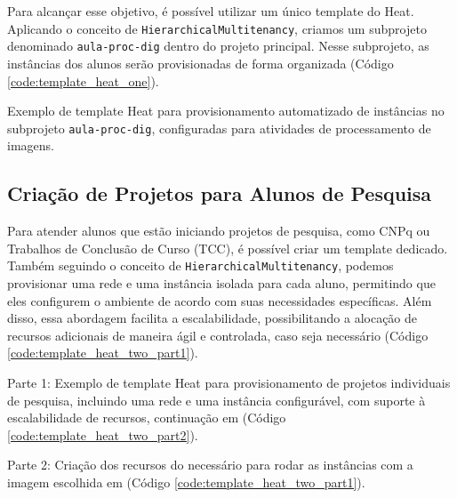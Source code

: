 Para alcançar esse objetivo, é possível utilizar um único template do Heat. Aplicando o conceito de \texttt{HierarchicalMultitenancy}, criamos um subprojeto denominado \texttt{aula-proc-dig} dentro do projeto principal. Nesse subprojeto, as instâncias dos alunos serão provisionadas de forma organizada (Código \ref{code:template_heat_one}).

\begin{listing}[h!]
    \noindent{}  
  \caption{Exemplo de template Heat para provisionamento automatizado de instâncias no subprojeto \texttt{aula-proc-dig}, configuradas para atividades de processamento de imagens.}
  \label{code:template_heat_one}
\end{listing}

\newpage

\subsection{Criação de Projetos para Alunos de Pesquisa}

Para atender alunos que estão iniciando projetos de pesquisa, como CNPq ou Trabalhos de Conclusão de Curso (TCC), é possível criar um template dedicado. Também seguindo o conceito de \texttt{HierarchicalMultitenancy}, podemos provisionar uma rede e uma instância isolada para cada aluno, permitindo que eles configurem o ambiente de acordo com suas necessidades específicas. Além disso, essa abordagem facilita a escalabilidade, possibilitando a alocação de recursos adicionais de maneira ágil e controlada, caso seja necessário (Código \ref{code:template_heat_two_part1}).

\begin{listing}[h!]
    \noindent{}  
  \caption{Parte 1: Exemplo de template Heat para provisionamento de projetos individuais de pesquisa, incluindo uma rede e uma instância configurável, com suporte à escalabilidade de recursos, continuação em (Código \ref{code:template_heat_two_part2}).}
  \label{code:template_heat_two_part1}
\end{listing}

\begin{listing}[h!]
  \noindent{}  
\caption{Parte 2: Criação dos recursos do necessário para rodar as instâncias com a imagem escolhida em (Código \ref{code:template_heat_two_part1}).}
\label{code:template_heat_two_part2}
\end{listing}



